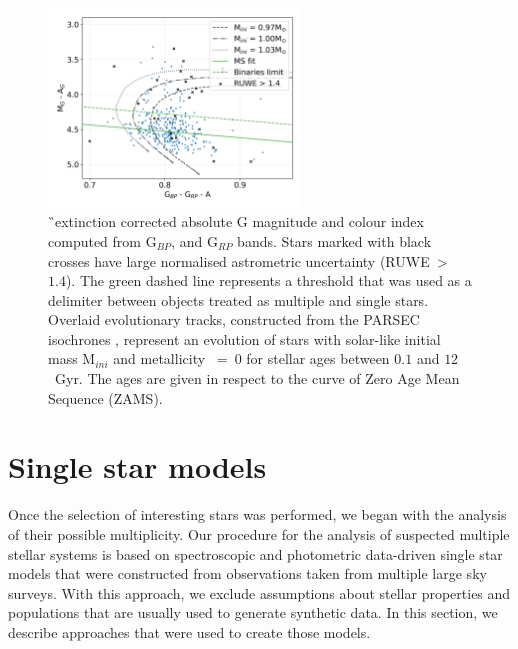 \begin{figure}
	\centering
	\includegraphics[width=0.6\textwidth]{mag_hr_gaia_bin-multi_evol_mh000_nores_ebv_c3_07.png}
	\caption{\G\ extinction corrected absolute G magnitude and colour index computed from G$_{BP}$, and G$_{RP}$ bands. Stars marked with black crosses have large normalised astrometric uncertainty (RUWE~>~$1.4$). The green dashed line represents a threshold that was used as a delimiter between objects treated as multiple and single stars. Overlaid evolutionary tracks, constructed from the PARSEC isochrones \cite{2017ApJ...835...77M}, represent an evolution of stars with solar-like initial mass M$_{ini}$ and metallicity \Mh~=~0 for stellar ages between $0.1$ and $12$~Gyr. The ages are given in respect to the curve of Zero Age Mean Sequence (ZAMS).}
	\label{fig:gabs_colour}
\end{figure}

\section{Single star models}
\label{sec:models_all}
Once the selection of interesting stars was performed, we began with the analysis of their possible multiplicity. Our procedure for the analysis of suspected multiple stellar systems is based on spectroscopic and photometric data-driven single star models that were constructed from observations taken from multiple large sky surveys. With this approach, we exclude assumptions about stellar properties and populations that are usually used to generate synthetic data. In this section, we describe approaches that were used to create those models.

